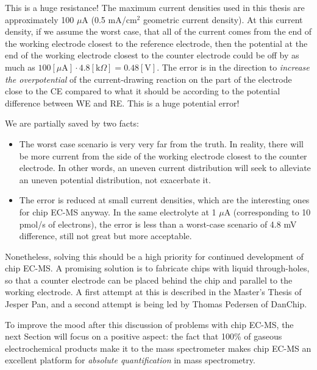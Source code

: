 This is a huge resistance! The maximum current densities used in this thesis are approximately 100 $\mu$A (0.5 mA/cm$^2$ geometric current density). At this current density, if we assume the worst case, that all of the current comes from the end of the working electrode closest to the reference electrode, then the potential at the end of the working electrode closest to the counter electrode could be off by as much as $100[\mu\text{A}]\cdot4.8 [\text{k}\Omega] = 0.48[\text{V}]$. The error is in the direction to \textit{increase the overpotential} of the current-drawing reaction on the part of the electrode close to the CE compared to what it should be according to the potential difference between WE and RE. This is a huge potential error! 

We are partially saved by two facts:
\begin{itemize}
	\item The worst case scenario is very very far from the truth. In reality, there will be more current from the side of the working electrode closest to the counter electrode. In other words, an uneven current distribution will seek to alleviate an uneven potential distribution, not exacerbate it.
	
	\item The error is reduced at small current densities, which are the interesting ones for chip EC-MS anyway. In the same electrolyte at 1 $\mu$A (corresponding to 10 pmol/s of electrons), the error is less than a worst-case scenario of 4.8 mV difference, still not great but more acceptable.
\end{itemize}

Nonetheless, solving this should be a high priority for continued development of chip EC-MS. A promising solution is to fabricate chips with liquid through-holes, so that a counter electrode can be placed behind the chip and parallel to the working electrode. A first attempt at this is described in the Master's Thesis of Jesper Pan\cite{Pan2018_MSc}, and a second attempt is being led by Thomas Pedersen of DanChip.

To improve the mood after this discussion of problems with chip EC-MS, the next Section will focus on a positive aspect: the fact that 100\% of gaseous electrochemical products make it to the mass spectrometer makes chip EC-MS an excellent platform for \textit{absolute quantification} in mass spectrometry.